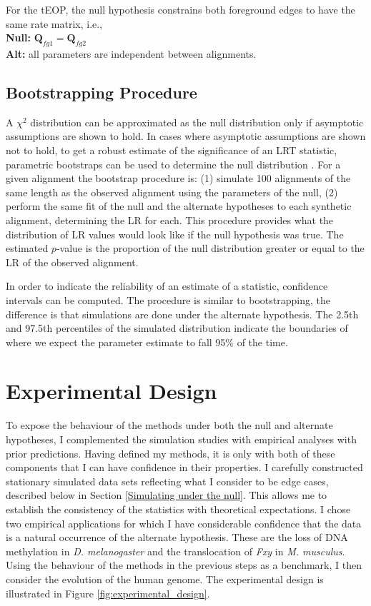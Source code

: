 For the tEOP, the null hypothesis constrains both foreground edges to have the same rate matrix, i.e., \\
\textbf{Null:} $\bm{Q}_{fg1} = \bm{Q}_{fg2}$  \\ 
\textbf{Alt:} all parameters are independent between alignments. 

\subsection{Bootstrapping Procedure}

A $\chi^2$ distribution can be approximated as the null distribution only if asymptotic assumptions are shown to hold. In cases where asymptotic assumptions are shown not to hold, to get a robust estimate of the significance of an LRT statistic, parametric bootstraps can be used to determine the null distribution \citep{Goldman1993StatisticalSubstitution}. For a given alignment the bootstrap procedure is: 
(1) simulate 100 alignments of the same length as the observed alignment using the parameters of the null, 
(2) perform the same fit of the null and the alternate hypotheses to each synthetic alignment, determining the LR for each.  
This procedure provides what the distribution of LR values would look like if the null hypothesis was true. The estimated $p$-value is the proportion of the null distribution greater or equal to the LR of the observed alignment. 

In order to indicate the reliability of an estimate of a statistic, confidence intervals can be computed. The procedure is similar to bootstrapping, the difference is that simulations are done under the alternate hypothesis. The 2.5th and 97.5th percentiles of the simulated distribution indicate the boundaries of where we expect the parameter estimate to fall 95\% of the time. 

\section{Experimental Design}

To expose the behaviour of the methods under both the null and alternate hypotheses, I complemented the simulation studies with empirical analyses with prior predictions. Having defined my methods, it is only with both of these components that I can have confidence in their properties. I carefully constructed stationary simulated data sets reflecting what I consider to be edge cases, described below in Section \ref{Simulating under the null}. This allows me to establish the consistency of the statistics with theoretical expectations. I chose two empirical applications for which I have considerable confidence that the data is a natural occurrence of the alternate hypothesis. These are the loss of DNA methylation in \textit{D. melanogaster} and the translocation of \textit{Fxy} in \textit{M. musculus}. Using the behaviour of the methods in the previous steps as a benchmark, I then consider the evolution of the human genome. The experimental design is illustrated in Figure \ref{fig:experimental_design}. 

